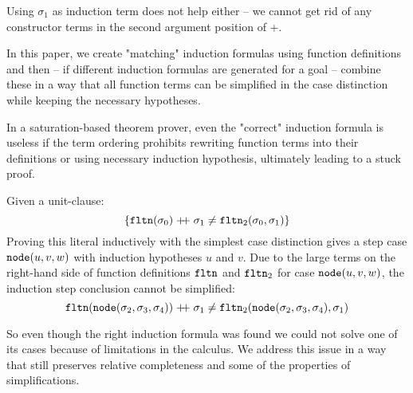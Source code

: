 \begin{example}
Using $\sigma_1$ as induction term does not help either -- we cannot get rid of any constructor terms in the second argument position of +.
\end{example}
In this paper, we create "matching" induction formulas using function definitions and then -- if different induction formulas are generated for a goal -- combine these in a way that all function terms can be simplified in the case distinction while keeping the necessary hypotheses.

In a saturation-based theorem prover, even the "correct" induction formula is useless if the term ordering prohibits rewriting function terms into their definitions or using necessary induction hypothesis, ultimately leading to a stuck proof.
\begin{example}
	Given a unit-clause:
	$$\{\mathtt{fltn}(\sigma_0)\mathrel{ +\hspace{-1mm}+ }\sigma_1\neq\mathtt{fltn}_2(\sigma_0,\sigma_1)\}$$
	Proving this literal inductively with the simplest case distinction gives a step case $\mathtt{node}(u,v,w)$ with induction hypotheses $u$ and $v$. Due to the large terms on the right-hand side of function definitions $\mathtt{fltn}$ and $\mathtt{fltn}_2$ for case $\mathtt{node}(u,v,w)$, the induction step conclusion cannot be simplified:
	$$\mathtt{fltn}(\mathtt{node}(\sigma_2,\sigma_3,\sigma_4))\mathrel{ +\hspace{-1mm}+ }\sigma_1\neq\mathtt{fltn}_2(\mathtt{node}(\sigma_2,\sigma_3,\sigma_4),\sigma_1)$$
\end{example}
So even though the right induction formula was found we could not solve one of its cases because of limitations in the calculus. We address this issue in a way that still preserves relative completeness and some of the properties of simplifications.